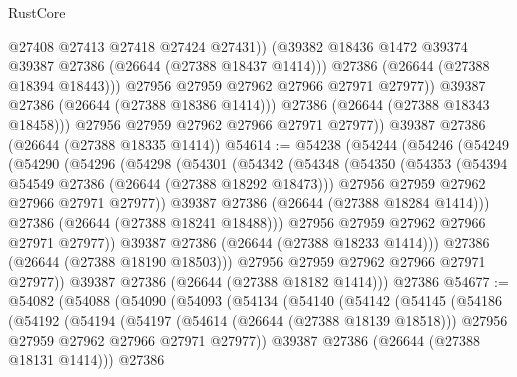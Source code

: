 \begin{lexlean}{RustCore}
\begin{coremodule}
                      @27408
                      @27413
                      @27418
                      @27424
                      @27431))
                  (@39382 @18436 @1472 @39374 @39387 @27386 (@26644 (@27388 @18437 @1414)))
                  @27386
                  (@26644 (@27388 @18394 @18443)))
                @27956
                @27959
                @27962
                @27966
                @27971
                @27977))
            @39387
            @27386
            (@26644 (@27388 @18386 @1414)))
          @27386
          (@26644 (@27388 @18343 @18458)))
        @27956
        @27959
        @27962
        @27966
        @27971
        @27977))
    @39387
    @27386
    (@26644 (@27388 @18335 @1414))
@54614 := @54238
    (@54244
      (@54246
        (@54249
          (@54290
            (@54296
              (@54298
                (@54301
                  (@54342
                    (@54348
                      (@54350
                        (@54353
                          (@54394 @54549 @27386 (@26644 (@27388 @18292 @18473)))
                          @27956
                          @27959
                          @27962
                          @27966
                          @27971
                          @27977))
                      @39387
                      @27386
                      (@26644 (@27388 @18284 @1414)))
                    @27386
                    (@26644 (@27388 @18241 @18488)))
                  @27956
                  @27959
                  @27962
                  @27966
                  @27971
                  @27977))
              @39387
              @27386
              (@26644 (@27388 @18233 @1414)))
            @27386
            (@26644 (@27388 @18190 @18503)))
          @27956
          @27959
          @27962
          @27966
          @27971
          @27977))
      @39387
      @27386
      (@26644 (@27388 @18182 @1414)))
    @27386
@54677 := @54082
    (@54088
      (@54090
        (@54093
          (@54134
            (@54140
              (@54142
                (@54145
                  (@54186
                    (@54192
                      (@54194
                        (@54197
                          (@54614 (@26644 (@27388 @18139 @18518)))
                          @27956
                          @27959
                          @27962
                          @27966
                          @27971
                          @27977))
                      @39387
                      @27386
                      (@26644 (@27388 @18131 @1414)))
                    @27386

\end{coremodule}
\end{lexlean}
